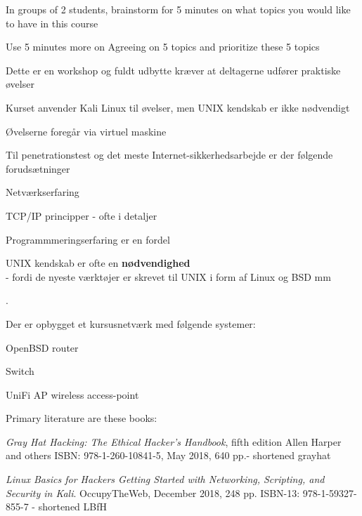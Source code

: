 \documentclass[Screen16to9,17pt]{foils}
\begin{document}

In groups of 2 students, brainstorm for 5 minutes on what topics you would like to have in this course

Use 5 minutes more on Agreeing on 5 topics and prioritize these 5 topics



\begin{list1}
\item Dette er en workshop og fuldt udbytte kræver at
  deltagerne udfører praktiske øvelser
\item Kurset anvender Kali Linux til øvelser, men UNIX kendskab
er ikke nødvendigt
\item Øvelserne foregår via virtuel maskine
\begin{list2}
\item Til penetrationstest og det meste Internet-sikkerhedsarbejde er der
følgende forudsætninger
\item Netværkserfaring
\item TCP/IP principper - ofte i detaljer
\item Programmmeringserfaring er en fordel
\item UNIX kendskab er ofte en {\bfseries nødvendighed}\\
- fordi de nyeste værktøjer er skrevet til UNIX i form af Linux og BSD
 mm
\end{list2}
\end{list1}

.

\begin{list1}
\item Der er opbygget et kursusnetværk med følgende systemer:
\begin{list2}
\item OpenBSD router
\item Switch
\item UniFi AP wireless access-point
\end{list2}
\end{list1}


Primary literature are these books:
\begin{list2}
\item \emph{Gray Hat Hacking: The Ethical Hacker's Handbook}, fifth edition
Allen Harper and others
ISBN: 978-1-260-10841-5, May 2018, 640 pp.- shortened grayhat
\item \emph{Linux Basics for Hackers Getting Started with Networking, Scripting, and Security in Kali}. OccupyTheWeb, December 2018, 248 pp. ISBN-13: 978-1-59327-855-7 - shortened LBfH
\end{list2}
\end{document}
